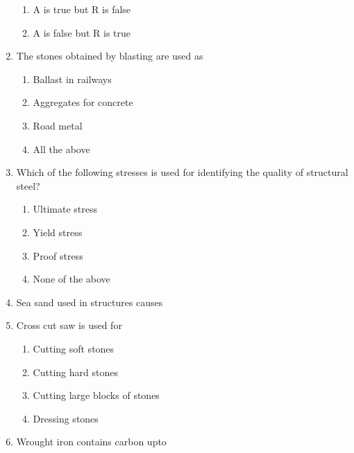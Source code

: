 \documentclass[11pt,a4paper]{article}
\begin{document}
\begin{enumerate}
\begin{enumerate}[label=\Alph*.]
\item{A is true but R is false}
\item{A is false but R is true}
\end{enumerate}
\item{The stones obtained by blasting are used as}
\begin{enumerate}[label=\Alph*.]
\item{Ballast in railways}
\item{Aggregates for concrete}
\item{Road metal}
\item{All the above}
\end{enumerate}
\item{Which of the following stresses is used for identifying the quality of structural steel?}
\begin{enumerate}[label=\Alph*.]
\item{Ultimate stress}
\item{Yield stress}
\item{Proof stress}
\item{None of the above}
\end{enumerate}
\item{Sea sand used in structures causes}
\\
\item{Cross cut saw is used for}
\begin{enumerate}[label=\Alph*.]
\item{Cutting soft stones}
\item{Cutting hard stones}
\item{Cutting large blocks of stones}
\item{Dressing stones}
\end{enumerate}
\item{Wrought iron contains carbon upto}
\\
\end{enumerate}
\end{document}
